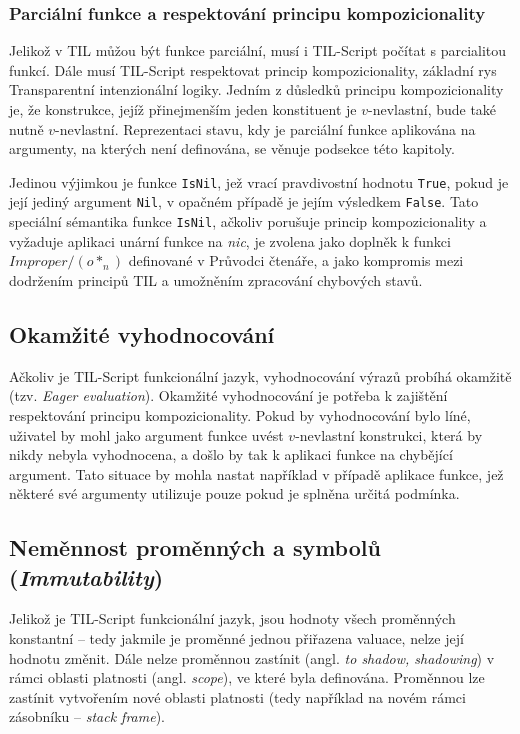 \subsubsection{Parciální funkce a respektování principu kompozicionality}

Jelikož v TIL můžou být funkce parciální, musí i TIL-Script počítat s parcialitou funkcí. Dále musí
TIL-Script respektovat princip kompozicionality, základní rys Transparentní intenzionální logiky.
Jedním z důsledků principu kompozicionality je, že konstrukce, jejíž přinejmenším jeden konstituent
je $v$-nevlastní, bude také nutně $v$-nevlastní. Reprezentaci stavu, kdy je parciální funkce
aplikována na argumenty, na kterých není definována, se věnuje podsekce 
této kapitoly. 

Jedinou výjimkou je funkce \lstinline{IsNil}, jež vrací pravdivostní hodnotu \lstinline{True},
pokud je její jediný argument \lstinline{Nil}, v opačném případě je jejím výsledkem
\lstinline{False}. Tato speciální sémantika funkce \lstinline{IsNil}, ačkoliv porušuje princip
kompozicionality a vyžaduje aplikaci unární funkce na \textit{nic}, je zvolena jako doplněk
k funkci $Improper/(o*_n)$ definované v Průvodci čtenáře, a jako kompromis mezi dodržením
principů TIL a umožněním zpracování chybových stavů.


\subsection{Okamžité vyhodnocování}

Ačkoliv je TIL-Script funkcionální jazyk, vyhodnocování výrazů probíhá okamžitě
(tzv. \textit{Eager evaluation}). Okamžité vyhodnocování je potřeba k zajištění respektování
principu kompozicionality. Pokud by vyhodnocování bylo líné, uživatel by mohl jako argument funkce
uvést $v$-nevlastní konstrukci, která by nikdy nebyla vyhodnocena, a došlo by tak k aplikaci funkce
na chybějící argument. Tato situace by mohla nastat například v případě aplikace funkce, jež 
některé své argumenty utilizuje pouze pokud je splněna určitá podmínka.

\subsection{Neměnnost proměnných a symbolů (\textit{Immutability})}

Jelikož je TIL-Script funkcionální jazyk, jsou hodnoty všech proměnných konstantní -- tedy
jakmile je proměnné jednou přiřazena valuace, nelze její hodnotu změnit. Dále nelze proměnnou
zastínit (angl. \textit{to shadow, shadowing}) v rámci oblasti platnosti (angl. \textit{scope}),
ve které byla definována. Proměnnou lze zastínit vytvořením nové oblasti platnosti (tedy například
na novém rámci zásobníku -- \textit{stack frame}).


